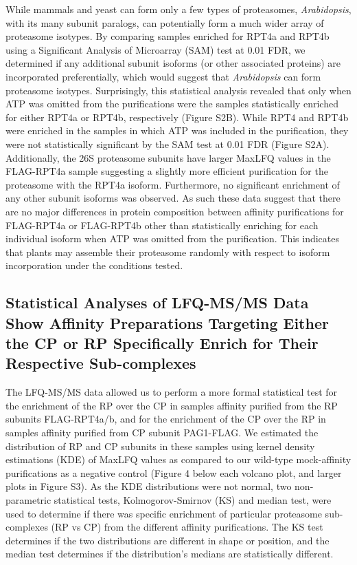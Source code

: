 While mammals and yeast can form only a few types of proteasomes, \textit{Arabidopsis}, with its many subunit paralogs, can potentially form a much wider array of proteasome isotypes. By comparing samples enriched for RPT4a and RPT4b using a Significant Analysis of Microarray (SAM) test at 0.01 FDR, we determined if any additional subunit isoforms (or other associated proteins) are incorporated preferentially, which would suggest that \textit{Arabidopsis} can form proteasome isotypes. Surprisingly, this statistical analysis revealed that only when ATP was omitted from the purifications were the samples statistically enriched for either RPT4a or RPT4b, respectively (Figure S2B). While RPT4 and RPT4b were enriched in the samples in which ATP was included in the purification, they were not statistically significant by the SAM test at 0.01 FDR (Figure S2A). Additionally, the 26S proteasome subunits have larger MaxLFQ values in the FLAG-RPT4a sample suggesting a slightly more efficient purification for the proteasome with the RPT4a isoform. Furthermore, no significant enrichment of any other subunit isoforms was observed. As such these data suggest that there are no major differences in protein composition between affinity purifications for FLAG-RPT4a or FLAG-RPT4b other than statistically enriching for each individual isoform when ATP was omitted from the purification. This indicates that plants may assemble their proteasome randomly with respect to isoform incorporation under the conditions tested. 

\subsection{Statistical Analyses of LFQ-MS/MS Data Show Affinity Preparations Targeting Either the CP or RP Specifically Enrich for Their Respective Sub-complexes}
The LFQ-MS/MS data allowed us to perform a more formal statistical test for the enrichment of the RP over the CP in samples affinity purified from the RP subunits FLAG-RPT4a/b, and for the enrichment of the CP over the RP in samples affinity purified from CP subunit PAG1-FLAG. We estimated the distribution of RP and CP subunits in these samples using kernel density estimations (KDE) of MaxLFQ values as compared to our wild-type mock-affinity purifications as a negative control (Figure 4 below each volcano plot, and larger plots in Figure S3).  As the KDE distributions were not normal, two non-parametric statistical tests, Kolmogorov-Smirnov (KS) and median test, were used to determine if there was specific enrichment of particular proteasome sub-complexes (RP vs CP) from the different affinity purifications. The KS test determines if the two distributions are different in shape or position, and the median test determines if the distribution’s medians are statistically different.

